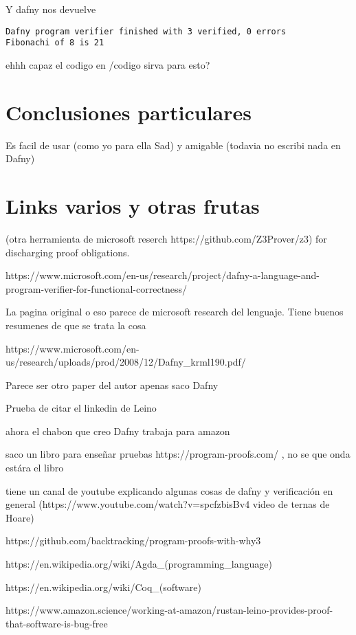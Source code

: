 \documentclass[runningheads]{llncs}
\begin{document}
Y dafny nos devuelve 
\begin{verbatim}
Dafny program verifier finished with 3 verified, 0 errors
Fibonachi of 8 is 21
\end{verbatim}
ehhh capaz el codigo en /codigo sirva para esto?

\section{Conclusiones particulares}
Es facil de usar (como yo para ella Sad) y amigable (todavia no escribi nada en Dafny)

\section{Links varios y otras frutas}
(otra herramienta de microsoft reserch https://github.com/Z3Prover/z3) for discharging proof obligations.

https://www.microsoft.com/en-us/research/project/dafny-a-language-and-program-verifier-for-functional-correctness/

La pagina original o eso parece de microsoft research del lenguaje. Tiene buenos resumenes de que se trata la cosa

https://www.microsoft.com/en-us/research/uploads/prod/2008/12/Dafny\_krml190.pdf/

Parece ser otro paper del autor apenas saco Dafny

 Prueba de citar el linkedin de Leino\cite{linkedinLeino}

ahora el chabon que creo Dafny trabaja para amazon

saco un libro para enseñar pruebas https://program-proofs.com/ , no se que onda estára el libro

tiene un canal de youtube explicando algunas cosas de dafny y verificación en general (https://www.youtube.com/watch?v=spcfzbisBv4 video de ternas de Hoare)

https://github.com/backtracking/program-proofs-with-why3

https://en.wikipedia.org/wiki/Agda\_(programming\_language)

https://en.wikipedia.org/wiki/Coq\_(software)

https://www.amazon.science/working-at-amazon/rustan-leino-provides-proof-that-software-is-bug-free


\end{document}
